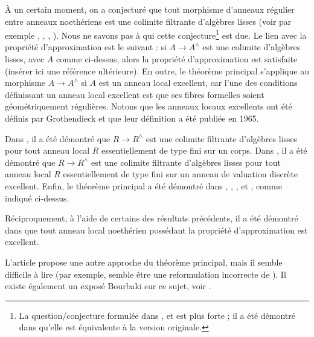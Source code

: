 \medskip\noindent
À un certain moment, on a conjecturé que tout morphisme d'anneaux régulier entre
anneaux noethériens est une colimite filtrante d'algèbres lisses (voir par exemple
\cite{Raynaud-Rennes}, \cite{popescu-global}, \cite{Artin-power-series},
\cite{Artin-Denef}). Nous ne savons pas à qui cette conjecture\footnote{La
question/conjecture formulée dans \cite{Artin-power-series},
\cite{Artin-Denef} et \cite{popescu-global} est plus forte ; il a été démontré
dans \cite{Cipu} qu'elle est équivalente à la version originale.}
est due. Le lien avec la propriété d'approximation est le suivant : si
$A \to A^\wedge$ est une colimite d'algèbres lisses, avec $A$ comme ci-dessus,
alors la propriété d'approximation est satisfaite (insérer ici une référence
ultérieure). En outre, le théorème principal s'applique au morphisme
$A \to A^\wedge$ si $A$ est un anneau local excellent, car l'une des conditions
définissant un anneau local excellent est que ses fibres formelles soient
géométriquement régulières. Notons que les anneaux locaux excellents ont été
définis par Grothendieck et que leur définition a été publiée en 1965.

\medskip\noindent
Dans \cite{Artin-power-series}, il a été démontré que
$R \to R^\wedge$ est une colimite filtrante d'algèbres lisses pour tout anneau
local $R$ essentiellement de type fini sur un corps.
Dans \cite{Rotthaus-Artin}, il a été démontré que $R \to R^\wedge$ est une
colimite filtrante d'algèbres lisses pour tout anneau local $R$ essentiellement
de type fini sur un anneau de valuation discrète excellent.
Enfin, le théorème principal a été démontré dans
\cite{popescu-GND}, \cite{popescu-GNDA}, \cite{popescu-letter}, 
\cite{Ogoma} et \cite{swan}, comme indiqué ci-dessus.

\medskip\noindent
Réciproquement, à l'aide de certains des résultats précédents, il a été démontré
dans \cite{Rotthaus-excellent} que tout anneau local noethérien possédant la
propriété d'approximation est excellent.

\medskip\noindent
L'article \cite{Spivakovsky} propose une autre approche du théorème principal,
mais il semble difficile à lire (par exemple, \cite[Lemma 5.2]{Spivakovsky}
semble être une reformulation incorrecte de \cite[Lemma 3]{Elkik}). Il existe
également un exposé Bourbaki sur ce sujet, voir \cite{Teissier}.












